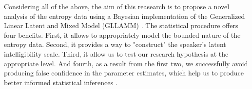 \begin{comment}
	As it was suggested, several factors are proposed by the literature, but these can be largely grouped into three categories: audiology, child and environmental related factors. For the first, they are the chronological age, age at implantation, the duration of device use, `hearing' age, bilateral or contralateral cochlear implantation, and the children's preoperative and postoperative hearing levels. For the second, there is the etiology or the cause of the hearing impairment (e.g. genetic, infections), additional disabilities (e.g. mental retardation, speech motor problems), and gender. Finally for the last, there is the communication modality. 
	
	Therefore, considering the aforementioned variables, and the relation complexity with themselves and the outcome, we believe that a causal framework would allow us to integrate previous literature on the matter, and also provide a more transparent way of state and analyze our research hypothesis.
	
\end{comment}

Considering all of the above, the aim of this reasearch is to propose a novel analysis of the entropy data using a Bayesian implementation of the Generalized Linear Latent and Mixed Model (GLLAMM) \citep{Rabe_et_al_2004a, Rabe_et_al_2004b, Rabe_et_al_2004c, Rabe_et_al_2012, Skrondal_et_al_2004a}. The statistical procedure offers four benefits. First, it allows to appropriately model the bounded nature of the entropy data. Second, it provides a way to "construct" the speaker's latent intelligibility scale. Third, it allow us to test our research hypothesis at the appropriate level. And fourth, as a result from the first two, we successfully avoid producing false confidence in the parameter estimates, which help us to produce better informed statistical inferences \citep{McElreath_2020}.

